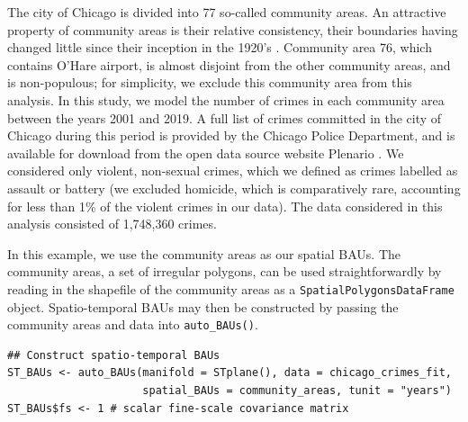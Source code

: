 \documentclass[12pt,a4paper]{article}
\begin{document}
The city of Chicago is divided into 77 so-called community areas. 
An attractive property of community areas is their relative consistency, their boundaries having changed little since their inception in the 1920's \citep{Chicago_library_census_data_info}. 
Community area 76, which contains O'Hare airport, is almost disjoint from the other community areas, and is non-populous; for simplicity, we exclude this community area from this analysis.
In this study, we model the number of crimes in each community area between the years 2001 and 2019.
A full list of crimes committed in the city of Chicago during this period is provided by the Chicago Police Department, and is available for download from the open data source website Plenario \citep{Plenario_open_source_website}. 
We considered only violent, non-sexual crimes, which we defined as crimes labelled as assault or battery 
(we excluded homicide, which is comparatively rare, accounting for less than 1\% of the violent crimes in our data). 
The data considered in this analysis consisted of 1,748,360 crimes.


In this example, we use the community areas as our spatial BAUs. 
The community areas, a set of irregular polygons, can be used straightforwardly by reading in the shapefile of the community areas as a \texttt{SpatialPolygonsDataFrame} object. 
Spatio-temporal BAUs may then be constructed by passing the community areas and data into \texttt{auto\_BAUs()}.

\begin{minipage}{\linewidth}
\begin{lstlisting}[style=R]
## Construct spatio-temporal BAUs
ST_BAUs <- auto_BAUs(manifold = STplane(), data = chicago_crimes_fit,
                     spatial_BAUs = community_areas, tunit = "years")
ST_BAUs$fs <- 1 # scalar fine-scale covariance matrix
\end{lstlisting}
\end{minipage}
\end{document}
